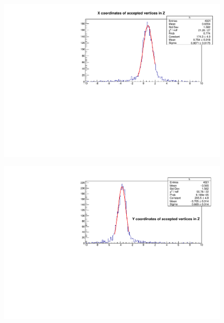 \documentclass[dvipsnames] {beamer}
\begin{document}
\begin{frame}
\begin{columns}[t]
           \begin{block}{\bf \centering }
            \begin{figure}[H]
              \includegraphics[width=1.\linewidth]{EmbeddingVertexX_Zcut.pdf}
            \end{figure}
             \begin{figure}[H]
              \includegraphics[width=1.\linewidth]{EmbeddingVertexY_Zcut.pdf}
            \end{figure}       
          \end{block}
        \end{columns}
      \end{frame}
\end{document}
